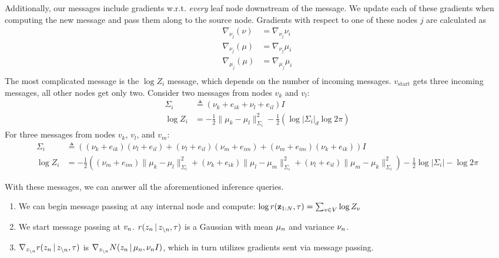 Additionally, our messages include gradients w.r.t. \emph{every} leaf node
downstream of the message.
We update each of these gradients when computing the new message
and pass them along to the source node.
Gradients with respect to one of these nodes $j$ are calculated as
\begin{equation}
\begin{split}
    \nabla_{\nu_j}(\nu) &= \nabla_{\nu_j} \nu_i\\
    \nabla_{\nu_j}(\mu) &= \nabla_{\nu_j} \mu_i\\
    \nabla_{\mu_j}(\mu) &= \nabla_{\mu_j} \mu_i\\
\end{split}
\end{equation}
The most complicated message is the $\log Z_i$ message, which depends
on the number of incoming messages. $v_{\text{start}}$ gets
three incoming messages,
all other nodes get only two. Consider
two messages from nodes $v_k$ and $v_l$:
\begin{equation}
\begin{split}
    \Sigma_i &\triangleq (\nu_k + e_{ik} + \nu_l + e_{il})I \\
    \log Z_i &= -\frac{1}{2}\|\mu_k - \mu_l\|^2_{\Sigma_i} - \frac{1}{2}\left(\log|\Sigma_i| _ d\log2\pi\right)
\end{split}
\end{equation}
For three messages from nodes
$v_k$, $v_l$, and $v_m$:
\begin{equation}
\begin{split}
    \Sigma_i &\triangleq \left((\nu_k + e_{ik})(\nu_l + e_{il}) + (\nu_l + e_{il})(\nu_m + e_{im}) + (\nu_m + e_{im})(\nu_k + e_{ik})\right)I \\
    \log Z_i &= -\frac{1}{2}\left((\nu_m + e_{im})\|\mu_k - \mu_l\|^2_{\Sigma_i} + (\nu_k + e_{ik})\|\mu_l - \mu_m\|^2_{\Sigma_i} + (\nu_l + e_{il})\|\mu_m - \mu_k\|^2_{\Sigma_i}\right) - \frac{1}{2}\log|\Sigma_i| - \log2\pi
\end{split}
\end{equation}

With these messages, we can answer all the aforementioned inference queries.
\begin{enumerate}
    \item We can begin message passing at any internal node and compute: $\log r(\mathbf{z}_{1:N}, \tau) = \sum_{v \in V} \log Z_v$
    \item We start message passing at $v_n$. $r(z_n \,|\, z_{\backslash n}, \tau)$ is a Gaussian with mean $\mu_n$ and variance $\nu_n$.
    \item $\nabla_{z_{\backslash n}} r(z_n \,|\, z_{\backslash n}, \tau)$ is $\nabla_{z_{\backslash n}} N(z_n \,|\, \mu_n, \nu_n I)$,
    which in turn utilizes gradients sent via message passing.
\end{enumerate}

